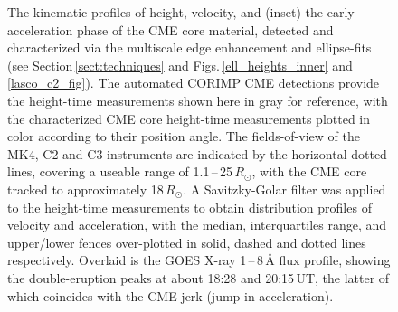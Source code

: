 \documentclass[namedreferences]{solarphysics}
\begin{document}
\begin{article}
\begin{figure}[!t]
\caption{The kinematic profiles of height, velocity, and (inset) the early acceleration phase of the CME core material, detected and characterized via the multiscale edge enhancement and ellipse-fits (see Section\,\ref{sect:techniques} and Figs.\,\ref{ell_heights_inner} and \ref{lasco_c2_fig}). The automated CORIMP CME detections provide the height-time measurements shown here in gray for reference, with the characterized CME core height-time measurements plotted in color according to their position angle. The fields-of-view of the MK4, C2 and C3 instruments are indicated by the horizontal dotted lines, covering a useable range of 1.1\,--\,25\,$R_{\odot}$, with the CME core tracked to approximately 18$\,R_{\odot}$. A Savitzky-Golar filter was applied to the height-time measurements to obtain distribution profiles of velocity and acceleration, with the median, interquartiles range, and upper/lower fences over-plotted in solid, dashed and dotted lines respectively. Overlaid is the GOES X-ray 1\,--\,8\,{\AA} flux profile, showing the double-eruption peaks at about 18:28 and 20:15\,UT, the latter of which coincides with the CME jerk (jump in acceleration).}
\label{kins_CMEcore}
\end{figure}


\end{article}
\end{document}
